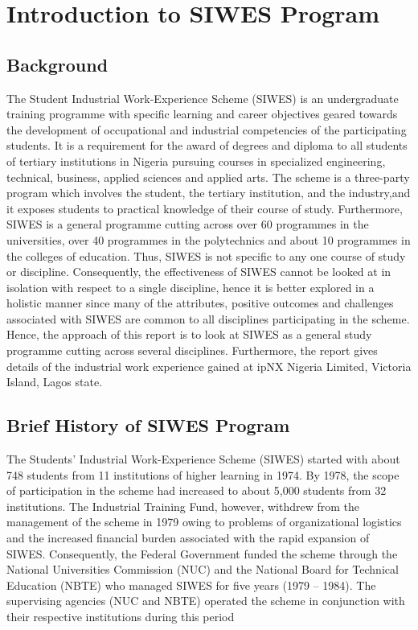 \chapter{Introduction to SIWES Program}

\section{Background}


The Student Industrial Work-Experience Scheme (SIWES) is an undergraduate training
programme with specific learning and career objectives geared towards the development of
occupational and industrial competencies of the participating students. It is a requirement for the
award of degrees and diploma to all students of tertiary institutions in Nigeria pursuing courses
in specialized engineering, technical, business, applied sciences and applied arts. The scheme is a
three-party program which involves the student, the tertiary institution, and the industry,and it exposes students to practical knowledge of their course of study.
Furthermore, SIWES is a general programme cutting across over 60 programmes in the
universities, over 40 programmes in the polytechnics and about 10 programmes in the colleges of
education. Thus, SIWES is not specific to any one course of study or discipline.
Consequently, the effectiveness of SIWES cannot be looked at in isolation with respect to a single
discipline, hence it is better explored in a holistic manner since many of the attributes, positive outcomes and challenges associated with SIWES are common to all disciplines participating in the scheme.
Hence, the approach of this report is to look at SIWES as a general study programme cutting across
several disciplines. Furthermore, the report gives details of the industrial work experience gained at ipNX Nigeria Limited, Victoria Island, Lagos state.
\section{Brief History of SIWES Program}


The Students’ Industrial Work-Experience Scheme (SIWES) started with about 748
students from 11 institutions of higher learning in 1974. By 1978, the scope of participation in the
scheme had increased to about 5,000 students from 32 institutions. The Industrial Training Fund,
however, withdrew from the management of the scheme in 1979 owing to problems of
organizational logistics and the increased financial burden associated with the rapid expansion of SIWES. Consequently, the Federal Government funded the scheme through the National Universities Commission (NUC) and the National Board for Technical Education (NBTE) who managed SIWES for five years (1979 – 1984). The supervising agencies (NUC and NBTE)
operated the scheme in conjunction with their respective institutions during this period
